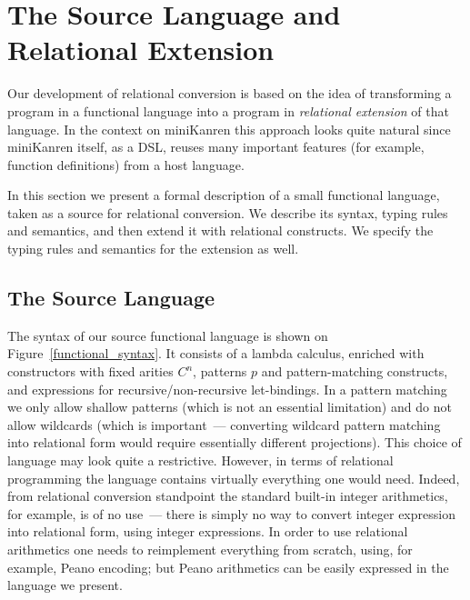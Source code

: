 \section{The Source Language and Relational Extension}

Our development of relational conversion is based on the idea of transforming a program in a functional
language into a program in \emph{relational extension} of that language. In the context on 
miniKanren this approach looks quite natural since miniKanren itself, as a DSL, reuses 
many important features (for example, function definitions) from a host language.

In this section we present a formal description of a small functional language, taken as a source
for relational conversion. We describe its syntax, typing rules and semantics, and then extend it
with relational constructs. We specify the typing rules and semantics for the extension as well.

\subsection{The Source Language}
\label{source_language}

The syntax of our source functional language is shown on Figure~\ref{functional_syntax}. It consists of a lambda calculus, 
enriched with constructors with fixed arities $C^n$, patterns $p$ and pattern-matching constructs, and  
expressions for recursive/non-recursive let-bindings.
In a pattern matching we only allow shallow patterns (which is not an essential limitation) and do not allow wildcards (which is 
important~--- converting wildcard pattern matching into relational form would require essentially different projections). 
This choice of language may 
look quite a restrictive. However, in terms of relational programming the language contains virtually everything one would need. Indeed, from
relational conversion standpoint the standard built-in integer arithmetics, for example, is of no use~--- 
there is simply no way to convert integer expression into relational form, using integer expressions. In order to use relational 
arithmetics one needs to reimplement everything from scratch, using, for example, Peano encoding; but Peano arithmetics can be
easily expressed in the language we present.

